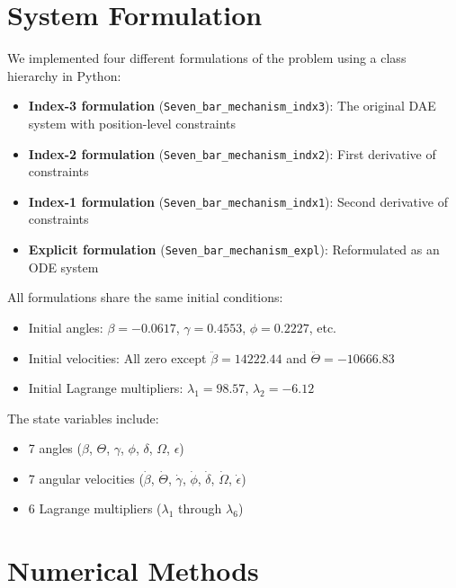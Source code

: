\documentclass{article}
\begin{document}
\section*{System Formulation}
\indent

We implemented four different formulations of the problem using a class hierarchy in Python:

\begin{itemize}
    \item \textbf{Index-3 formulation} (\texttt{Seven\_bar\_mechanism\_indx3}): The original DAE system with position-level constraints
    \item \textbf{Index-2 formulation} (\texttt{Seven\_bar\_mechanism\_indx2}): First derivative of constraints
    \item \textbf{Index-1 formulation} (\texttt{Seven\_bar\_mechanism\_indx1}): Second derivative of constraints
    \item \textbf{Explicit formulation} (\texttt{Seven\_bar\_mechanism\_expl}): Reformulated as an ODE system
\end{itemize}

All formulations share the same initial conditions:
\begin{itemize}
    \item Initial angles: $\beta = -0.0617$, $\gamma = 0.4553$, $\phi = 0.2227$, etc.
    \item Initial velocities: All zero except $\ddot{\beta} = 14222.44$ and $\ddot{\Theta} = -10666.83$
    \item Initial Lagrange multipliers: $\lambda_1 = 98.57$, $\lambda_2 = -6.12$
\end{itemize}

The state variables include:
\begin{itemize}
    \item 7 angles ($\beta$, $\Theta$, $\gamma$, $\phi$, $\delta$, $\Omega$, $\epsilon$)
    \item 7 angular velocities ($\dot{\beta}$, $\dot{\Theta}$, $\dot{\gamma}$, $\dot{\phi}$, $\dot{\delta}$, $\dot{\Omega}$, $\dot{\epsilon}$)
    \item 6 Lagrange multipliers ($\lambda_1$ through $\lambda_6$)
\end{itemize}

\section*{Numerical Methods}
\indent
\end{document}
